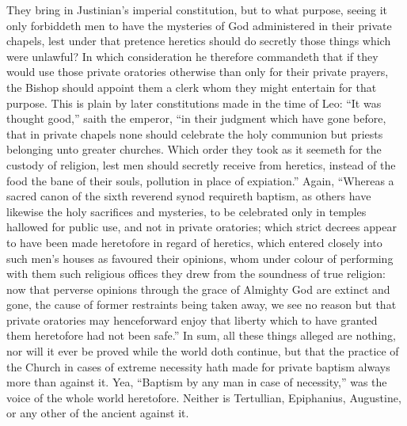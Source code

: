 They bring in Justinian’s imperial constitution, but to what purpose, seeing it only forbiddeth men to have the mysteries of God administered in their private chapels, lest under that pretence heretics should do secretly those things which were unlawful? In which consideration he therefore commandeth that if they would use those private oratories otherwise than only for their private prayers, the Bishop should appoint them a clerk whom they might entertain for that purpose. This is plain by later constitutions made in the time of Leo: “It was thought good,” saith the emperor, “in their judgment which have gone before, that in private chapels none should celebrate the holy communion but priests belonging unto greater churches. Which order they took as it seemeth for the custody of religion, lest men should secretly receive from heretics, instead of the food the bane of their souls, pollution in place of expiation.” Again, “Whereas a sacred canon of the sixth reverend synod requireth baptism, as others have likewise the holy sacrifices and mysteries, to be celebrated only in temples hallowed for public use, and not in private oratories; which strict decrees appear to have been made heretofore in regard of heretics, which entered closely into such men’s houses as favoured their opinions, whom under colour of performing with them such religious offices they drew from the soundness of true religion: now that perverse opinions through the grace of Almighty God  are extinct and gone, the cause of former restraints being taken away, we see no reason but that private oratories may henceforward enjoy that liberty which to have granted them heretofore had not been safe.”
In sum, all these things alleged are nothing, nor will it ever be proved while the world doth continue, but that the practice of the Church in cases of extreme necessity hath made for private baptism always more than against it.
Yea, “Baptism by any man in case of necessity,” was the voice of the whole world heretofore. Neither is Tertullian, Epiphanius, Augustine, or any other of the ancient against it.
